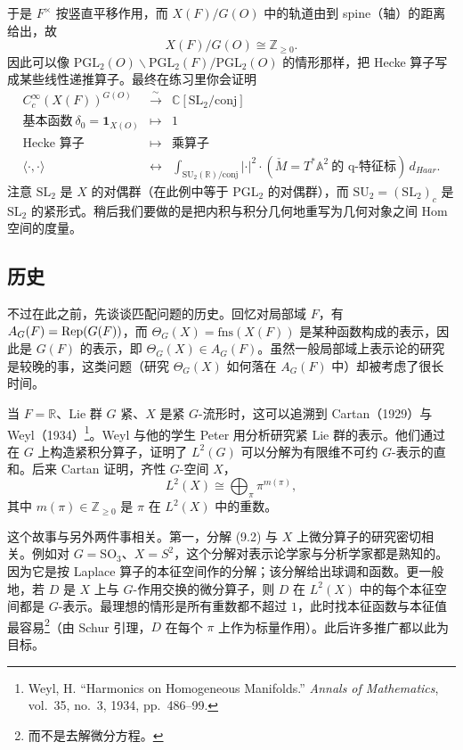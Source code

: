 于是 $F^\times$ 按竖直平移作用，而 $X(F)/G(O)$ 中的轨道由到 spine（轴）的距离给出，故
\[
  X(F)/G(O)\cong\mathbb Z_{\ge0}.
\]
因此可以像 $\mathrm{PGL}_2(O)\backslash\mathrm{PGL}_2(F)/\mathrm{PGL}_2(O)$ 的情形那样，把 Hecke 算子写成某些线性递推算子。最终在练习里你会证明
\begin{equation}
  \begin{array}{rcl}
    C_c^\infty(X(F))^{G(O)} & \xrightarrow{\ \sim\ } & \mathbb C[\mathrm{SL}_2/\mathrm{conj}]\\
    \text{基本函数}\ \delta_0=\mathbf 1_{X(O)} & \mapsto & 1\\
    \text{Hecke 算子} & \mapsto & \text{乘算子}\\
    \langle\cdot,\cdot\rangle & \leftrightarrow & \displaystyle\int_{\mathrm{SU}_2(\mathbb R)/\mathrm{conj}}|\cdot|^2\cdot(\check M=T^*\mathbb A^2\ \text{的 q-特征标})\,d_{Haar}.
  \end{array}
  \label{eq:9-1}
\end{equation}
注意 $\mathrm{SL}_2$ 是 $X$ 的对偶群（在此例中等于 $\mathrm{PGL}_2$ 的对偶群），而 $\mathrm{SU}_2=(\mathrm{SL}_2)_c$ 是 $\mathrm{SL}_2$ 的紧形式。稍后我们要做的是把内积与积分几何地重写为几何对象之间 Hom 空间的度量。

\subsection{历史}

不过在此之前，先谈谈匹配问题的历史。回忆对局部域 $F$，有 $A_G(F)=\operatorname{Rep}(G(F))$，而 $\Theta_G(X)=\mathrm{fns}(X(F))$ 是某种函数构成的表示，因此是 $G(F)$ 的表示，即 $\Theta_G(X)\in A_G(F)$。虽然一般局部域上表示论的研究是较晚的事，这类问题（研究 $\Theta_G(X)$ 如何落在 $A_G(F)$ 中）却被考虑了很长时间。

当 $F=\mathbb R$、Lie 群 $G$ 紧、$X$ 是紧 $G$-流形时，这可以追溯到 Cartan（1929）与 Weyl（1934）\footnote{Weyl, H. ``Harmonics on Homogeneous Manifolds.'' \emph{Annals of Mathematics}, vol.\ 35, no.\ 3, 1934, pp.\ 486--99.}。Weyl 与他的学生 Peter 用分析研究紧 Lie 群的表示。他们通过在 $G$ 上构造紧积分算子，证明了 $L^2(G)$ 可以分解为有限维不可约 $G$-表示的直和。后来 Cartan 证明，齐性 $G$-空间 $X$，
\begin{equation}
  L^2(X)\cong\bigoplus_\pi\pi^{m(\pi)},
  \label{eq:9-2}
\end{equation}
其中 $m(\pi)\in\mathbb Z_{\ge0}$ 是 $\pi$ 在 $L^2(X)$ 中的重数。

这个故事与另外两件事相关。第一，分解 (9.2) 与 $X$ 上微分算子的研究密切相关。例如对 $G=\mathrm{SO}_3$、$X=S^2$，这个分解对表示论学家与分析学家都是熟知的。因为它是按 Laplace 算子的本征空间作的分解；该分解给出球调和函数。更一般地，若 $D$ 是 $X$ 上与 $G$-作用交换的微分算子，则 $D$ 在 $L^2(X)$ 中的每个本征空间都是 $G$-表示。最理想的情形是所有重数都不超过 $1$，此时找本征函数与本征值最容易\footnote{而不是去解微分方程。}（由 Schur 引理，$D$ 在每个 $\pi$ 上作为标量作用）。此后许多推广都以此为目标。

